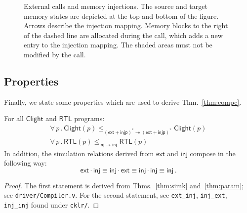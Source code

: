 \documentclass[acmsmall,screen,review,anonymous]{acmart}
\newcommand{\kw}[1]{\ensuremath{ \mathsf{#1} }}
\begin{document}
\begin{figure} %
  \caption{External calls and memory injections.
    The source and target memory states are
    depicted at the top and bottom
    of the figure. Arrows describe the injection mapping.
    Memory blocks to the right of the dashed line
    are allocated during the call,
    which adds a new entry to the injection mapping.
    The shaded areas must not be modified by the call.
  }
  \label{fig:injp}
\end{figure}


\subsection{Properties} \label{sec:cklr-props} %

Finally,
we state some properties which are used
to derive Thm.~\ref{thm:compc}.

\begin{theorem} \label{thm:cklr-props}
For all $\kw{Clight}$ and $\kw{RTL}$ programs:
\begin{gather*}
\forall \, p \,.\,
  \kw{Clight}(p)
  \le_{(\kw{ext} + \kw{injp})^* \twoheadrightarrow (\kw{ext} + \kw{injp})^*}
  \kw{Clight}(p) \\
\forall \, p \,.\,
  \kw{RTL}(p)
  \le_{\kw{inj} \twoheadrightarrow \kw{inj}}
  \kw{RTL}(p)
\end{gather*}
In addition,
the simulation relations derived from $\kw{ext}$ and $\kw{inj}$
compose in the following way:
\[
  \kw{ext} \cdot \kw{inj} \equiv
  \kw{inj} \cdot \kw{ext} \equiv
  \kw{inj} \cdot \kw{inj} \equiv
  \kw{inj} \,.
\]
\begin{proof}
The first statement is derived from
Thms.~\ref{thm:simk} and~\ref{thm:param};
see \texttt{driver/Compiler.v}.
For the second statement, see
\texttt{ext\_inj}, \texttt{inj\_ext}, \texttt{inj\_inj}
found under \texttt{cklr/}.
\end{proof}
\end{theorem}
\end{document}
